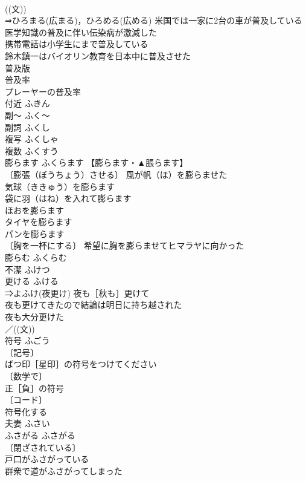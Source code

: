 \documentclass[8pt]{extreport}
\begin{document}
\begin{CJK}{UTF8}{min}
\\	((文)) 
\\	⇒ひろまる(広まる)，ひろめる(広める) 米国では一家に2台の車が普及している 
\\	医学知識の普及に伴い伝染病が激減した 
\\	携帯電話は小学生にまで普及している 
\\	鈴木鎮一はバイオリン教育を日本中に普及させた 
\\	普及版 
\\	普及率 
\\	プレーヤーの普及率 
\\	付近	ふきん	
\\	副～	ふく～	
\\	副詞	ふくし	
\\	複写	ふくしゃ	
\\	複数	ふくすう	
\\	膨らます	ふくらます	【膨らます・▲脹らます】 
\\	〔膨張（ぼうちょう）させる〕 風が帆（ほ）を膨らませた 
\\	気球（ききゅう）を膨らます 
\\	袋に羽（はね）を入れて膨らます 
\\	ほおを膨らます 
\\	タイヤを膨らます 
\\	パンを膨らます 
\\	〔胸を一杯にする〕 希望に胸を膨らませてヒマラヤに向かった 
\\	膨らむ	ふくらむ	
\\	不潔	ふけつ	
\\	更ける	ふける	
\\	⇒よふけ(夜更け) 夜も［秋も］更けて 
\\	夜も更けてきたので結論は明日に持ち越された 
\\	夜も大分更けた 
\\	／((文)) 
\\	符号	ふごう	
\\	〔記号〕
\\	ばつ印［星印］の符号をつけてください 
\\	〔数学で〕
\\	正［負］の符号 
\\	〔コード〕
\\	符号化する 
\\	夫妻	ふさい	
\\	ふさがる	ふさがる	
\\	〔閉ざされている〕
\\	戸口がふさがっている 
\\	群衆で道がふさがってしまった 

\end{CJK}
\end{document}
